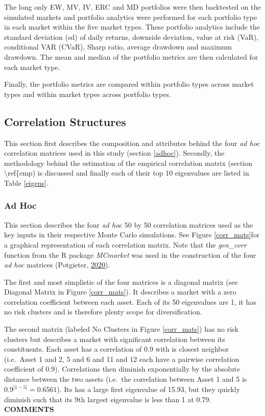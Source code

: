\documentclass[11pt,preprint, authoryear]{elsarticle}
\numberwithin{equation}{section}
\numberwithin{figure}{section}
\numberwithin{table}{section}
\begin{document}
The long only EW, MV, IV, ERC and MD portfolios were then backtested on
the simulated markets and portfolio analytics were performed for each
portfolio type in each market within the five market types. These
portfolio analytics include the standard deviation (sd) of daily
returns, downside deviation, value at risk (VaR), conditional VAR
(CVaR), Sharp ratio, average drawdown and maximum drawdown. The mean and
median of the portfolio metrics are then calculated for each market
type.

Finally, the portfolio metrics are compared within portfolio types
across market types and within market types across portfolio types.

\hypertarget{correlation-structures}{%
\subsection{\texorpdfstring{Correlation Structures
\label{corr_struc}}{Correlation Structures }}\label{correlation-structures}}

This section first describes the composition and attributes behind the
four \emph{ad hoc} correlation matrices used in this study (section
\ref{adhoc}). Secondly, the methodology behind the estimation of the
empirical correlation matrix (section \textbackslash ref\{emp) is
discussed and finally each of their top 10 eigenvalues are listed in
Table \ref{eigens}.

\hypertarget{ad-hoc}{%
\subsubsection{\texorpdfstring{Ad Hoc
\label{adhoc}}{Ad Hoc }}\label{ad-hoc}}

This section describes the four \emph{ad hoc} 50 by 50 correlation
matrices used as the key inputs in their respective Monte Carlo
simulations. See Figure \ref{corr_mats}for a graphical representation of
each correlation matrix. Note that the \emph{gen\_corr} function from
the R package \emph{MCmarket} was used in the construction of the four
\emph{ad hoc} matrices (Potgieter,
\protect\hyperlink{ref-MCmarket}{2020}).

The first and most simplistic of the four matrices is a diagonal matrix
(see Diagonal Matrix in Figure \ref{corr_mats}). It describes a market
with a zero correlation coefficient between each asset. Each of its 50
eigenvalues are 1, it has no risk clusters and is therefore plenty scope
for diversification.

The second matrix (labeled No Clusters in Figure \ref{corr_mats}) has no
risk clusters but describes a market with significant correlation
between its constituents. Each asset has a correlation of 0.9 with is
closest neighbor (i.e.~Asset 1 and 2, 5 and 6 and 11 and 12 each have a
pairwise correlation coefficient of 0.9). Correlations then diminish
exponentially by the absolute distance between the two assets (i.e.~the
correlation between Asset 1 and 5 is \(0.9^{|1-5|}=0.6561\)). Its has a
large first eigenvalue of 15.93, but they quickly diminish such that its
9th largest eigenvalue is less than 1 at 0.79. \textbf{COMMENTS}
\end{document}

